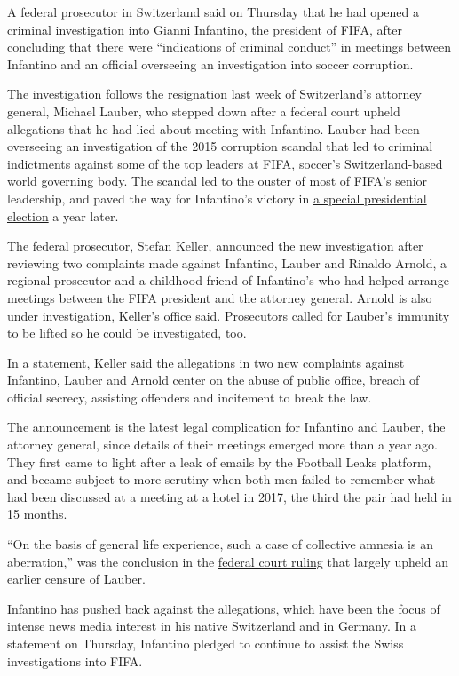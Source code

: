 A federal prosecutor in Switzerland said on Thursday that he had opened
a criminal investigation into Gianni Infantino, the president of FIFA,
after concluding that there were ``indications of criminal conduct'' in
meetings between Infantino and an official overseeing an investigation
into soccer corruption.

The investigation follows the resignation last week of Switzerland's
attorney general, Michael Lauber, who stepped down after a federal court
upheld allegations that he had lied about meeting with Infantino. Lauber
had been overseeing an investigation of the 2015 corruption scandal that
led to criminal indictments against some of the top leaders at FIFA,
soccer's Switzerland-based world governing body. The scandal led to the
ouster of most of FIFA's senior leadership, and paved the way for
Infantino's victory in
\href{https://www.nytimes.com/2016/02/27/sports/soccer/gianni-infantino-is-elected-fifa-president.html}{a
special presidential election} a year later.

The federal prosecutor, Stefan Keller, announced the new investigation
after reviewing two complaints made against Infantino, Lauber and
Rinaldo Arnold, a regional prosecutor and a childhood friend of
Infantino's who had helped arrange meetings between the FIFA president
and the attorney general. Arnold is also under investigation, Keller's
office said. Prosecutors called for Lauber's immunity to be lifted so he
could be investigated, too.

In a statement, Keller said the allegations in two new complaints
against Infantino, Lauber and Arnold center on the abuse of public
office, breach of official secrecy, assisting offenders and incitement
to break the law.

The announcement is the latest legal complication for Infantino and
Lauber, the attorney general, since details of their meetings emerged
more than a year ago. They first came to light after a leak of emails by
the Football Leaks platform, and became subject to more scrutiny when
both men failed to remember what had been discussed at a meeting at a
hotel in 2017, the third the pair had held in 15 months.

``On the basis of general life experience, such a case of collective
amnesia is an aberration,'' was the conclusion in the
\href{https://www.bvger.ch/bvger/fr/home/medias/medienmitteilungen-2020/lauber.html}{federal
court ruling} that largely upheld an earlier censure of Lauber.

Infantino has pushed back against the allegations, which have been the
focus of intense news media interest in his native Switzerland and in
Germany. In a statement on Thursday, Infantino pledged to continue to
assist the Swiss investigations into FIFA.

